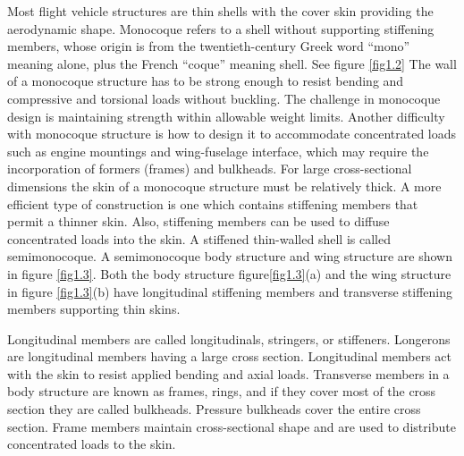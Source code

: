 \documentclass{AeroStructure-ERJohnson}
\begin{document}
Most flight vehicle structures are thin shells with the cover skin
providing the aerodynamic shape. Monocoque refers to a shell
without supporting stiffening members, whose origin is from the
twentieth-century Greek word ``mono'' meaning alone, plus the
French ``coque'' meaning shell. See figure \ref{fig1.2} The wall of a
monocoque structure has to be strong enough to resist bending and
compressive and torsional loads without buckling. The challenge in
monocoque design is maintaining strength within allowable weight
limits. Another difficulty with monocoque structure is how to
design it to accommodate concentrated loads such as engine
mountings and wing-fuselage interface, which may require the
incorporation of formers (frames) and bulkheads. For large
cross-sectional dimensions the skin of a monocoque structure must
be relatively thick. A more efficient type of construction is one which contains
stiffening members that permit a thinner skin. Also, stiffening
members can be used to diffuse concentrated loads into the skin. A
stiffened thin-walled shell is called semimonocoque. A
semimonocoque body structure and wing structure are shown in
figure \ref{fig1.3}. Both the body structure figure\ref{fig1.3}(a) and the wing
structure in figure \ref{fig1.3}(b) have longitudinal stiffening members
and transverse stiffening members supporting thin skins.



{\def\thefigure{1.3}
}


Longitudinal members are called longitudinals, stringers, or stiffeners.
Longerons are longitudinal members having a large cross section.
Longitudinal members act with the skin to resist applied bending and axial
loads. Transverse members in a body structure are known as frames, rings,
and if they cover most of the cross section they are called bulkheads.
Pressure bulkheads cover the entire cross section. Frame members maintain
cross-sectional shape and are used to distribute concentrated loads to the
skin.
\end{document}
